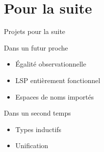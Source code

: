 \documentclass[12pt, aspectratio=169]{beamer}
\begin{document}
    \section{Pour la suite}

        \begin{frame}{Projets pour la suite}

            \begin{block}{Dans un futur proche}

                \begin{itemize}
                    \item Égalité observationnelle \pause
                    \item LSP entièrement fonctionnel \pause
                    \item Espaces de noms importés
                \end{itemize}

            \end{block}

            \vfill
            \pause

            \begin{block}{Dans un second temps}

                \begin{itemize}
                    \item Types inductifs \pause
                    \item Unification
                \end{itemize}

            \end{block}

        \end{frame}
\end{document}
